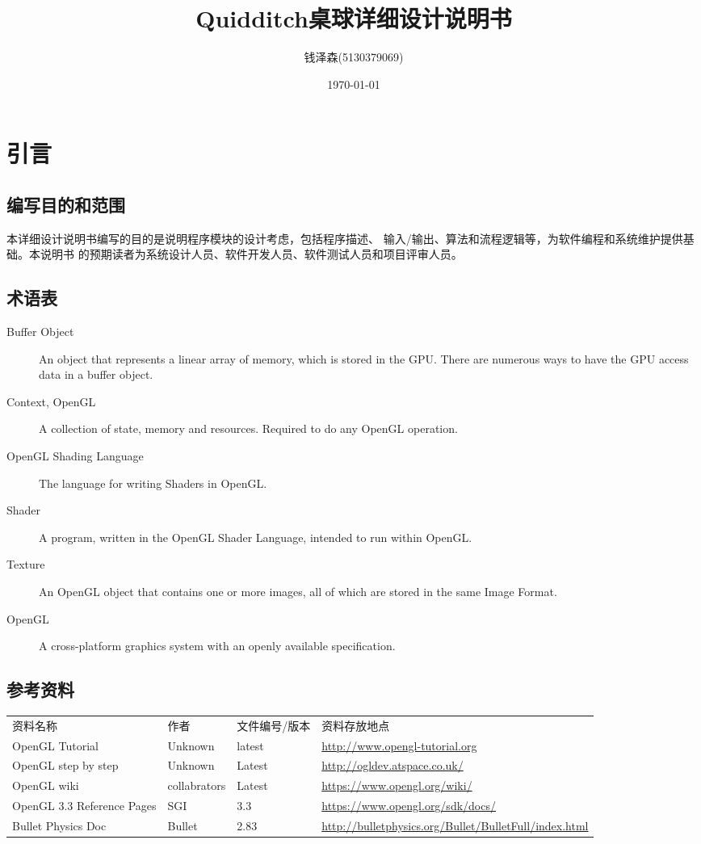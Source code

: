 \documentclass[11pt]{article}
\author{钱泽森(5130379069)}
\date{\today}
\title{Quidditch桌球详细设计说明书}
\begin{document}
\maketitle
\tableofcontents


\section{引言}
\label{sec-1}
\subsection{编写目的和范围}
\label{sec-1-1}
本详细设计说明书编写的目的是说明程序模块的设计考虑，包括程序描述、
输入/输出、算法和流程逻辑等，为软件编程和系统维护提供基础。本说明书
的预期读者为系统设计人员、软件开发人员、软件测试人员和项目评审人员。
\subsection{术语表}
\label{sec-1-2}
\begin{description}
\item[{Buffer Object}] An object that represents a linear array of
memory, which is stored in the GPU. There are
numerous ways to have the GPU access data in a
buffer object.
\item[{Context, OpenGL}] A collection of state, memory and resources.
Required to do any OpenGL operation.
\item[{OpenGL Shading Language}] The language for writing Shaders in
OpenGL.
\item[{Shader}] A program, written in the OpenGL Shader Language,
intended to run within OpenGL.
\item[{Texture}] An OpenGL object that contains one or more images, all
of which are stored in the same Image Format.
\item[{OpenGL}] A cross-platform graphics system with an openly
available specification.
\end{description}
\subsection{参考资料}
\label{sec-1-3}
\begin{center}
\begin{tabular}{llll}
资料名称 & 作者 & 文件编号/版本 & 资料存放地点\\
OpenGL Tutorial & Unknown & latest & \url{http://www.opengl-tutorial.org}\\
OpenGL step by step & Unknown & Latest & \url{http://ogldev.atspace.co.uk/}\\
OpenGL wiki & collabrators & Latest & \url{https://www.opengl.org/wiki/}\\
OpenGL 3.3 Reference Pages & SGI & 3.3 & \url{https://www.opengl.org/sdk/docs/}\\
Bullet Physics Doc & Bullet & 2.83 & \url{http://bulletphysics.org/Bullet/BulletFull/index.html}\\
\end{tabular}
\end{center}
\end{document}
